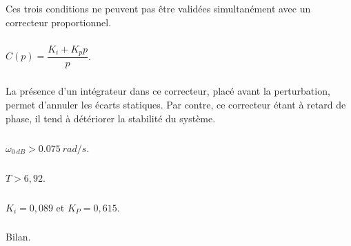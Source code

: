 \documentclass[10pt,fleqn]{article} %
\begin{document}
\begin{multicols}{2}
Ces trois conditions ne peuvent pas être validées simultanément avec un correcteur proportionnel.
\subparagraph{}
$C(p)=\dfrac{K_i+K_p p}{p}$.

\subparagraph{}


\subparagraph{}
La présence d’un intégrateur dans ce correcteur, placé avant la perturbation, permet d’annuler   les écarts statiques.
Par contre, ce correcteur étant à retard de phase, il tend à détériorer la stabilité du système.


\subparagraph{}
$\omega_{\SI{0}{dB}}>\SI{0,075}{rad/s}$.


\subparagraph{}
$T>6,92$.


\subparagraph{}
$K_i=0,089$ et $K_P=0,615$.

\subparagraph{} Bilan.
\end{multicols}
\end{document}
